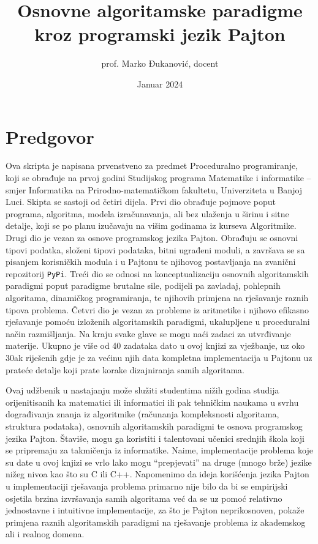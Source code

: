 \documentclass[b4paper,12pt]{book} %
\begin{document}
\author{prof. Marko Đukanović, docent}
\title{Osnovne algoritamske paradigme kroz programski jezik Pajton}
\date{Januar 2024}

 
\maketitle
 
\tableofcontents
 \clearpage
 \setcounter{page}{1}

\chapter*{Predgovor}

Ova skripta je napisana prvenstveno za predmet Proceduralno programiranje, koji se obrađuje na prvoj godini Studijskog programa Matematike i informatike -- smjer Informatika na Prirodno-matematičkom fakultetu, Univerziteta u Banjoj Luci. Skipta se sastoji od četiri dijela. Prvi dio obrađuje pojmove poput  programa, algoritma, modela izraču\-navanja, ali bez ulaženja u širinu i sitne detalje, koji se po planu izučavaju na višim godinama iz kurseva Algoritmike. Drugi dio je vezan za osnove programskog jezika Pajton. Obrađuju se  osnovni tipovi podatka, složeni tipovi podataka, bitni ugrađeni moduli, a završava se sa pisanjem korisničkih modula i u Pajtonu te njihovog postavljanja na zvanični repozitorij \texttt{PyPi}. Treći dio se odnosi na konceptualizaciju osnovnih algoritamskih paradigmi poput paradigme brutalne sile, podijeli pa zavladaj, pohlepnih algoritama, dinamičkog programiranja, te njihovih primjena na rješavanje raznih tipova problema. Četvri dio je vezan za probleme iz aritmetike i njihovo efikasno rješavanje pomoću izloženih algoritamskih paradigmi, ukalupljene u proceduralni način razmišljanja.  Na kraju svake glave se mogu naći zadaci za utvrđivanje materije. Ukupno je više od 40 zadataka dato u ovoj knjizi za vježbanje, uz oko 30ak riješenih gdje je za većinu njih data kompletna implementacija u Pajtonu uz prateće detalje koji prate korake dizajniranja samih algoritama. 
 
 
 Ovaj udžbenik u nastajanju može služiti studentima nižih godina studija orijenitisanih ka matematici ili informatici ili pak tehničkim naukama u svrhu dograđivanja znanja iz algoritmike (računanja kompleksnosti algoritama, struktura podataka), osnovnih algoritamskih paradigmi te osnova programskog jezika Pajton. Štaviše, mogu ga koristiti i talentovani učenici srednjih škola koji se pripremaju za takmičenja iz informatike. Naime, implementacije problema koje su date u ovoj knjizi se vrlo lako mogu ``prepjevati'' na druge (mnogo brže) jezike nižeg nivoa kao što su C ili C++. Napomenimo da ideja korišćenja jezika Pajton u implementaciji rješavanja problema primarno nije bilo da bi se  empirijski osjetila brzina izvršavanja samih algoritama već da se uz pomoć relativno jednostavne i intuitivne implementacije, za što je Pajton neprikosnoven, pokaže primjena raznih algoritamskih paradigmi na rješavanje problema iz akademskog ali i realnog domena.
\end{document}
